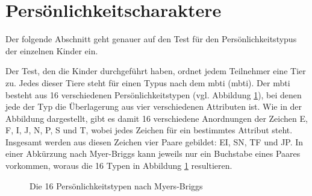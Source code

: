 \section{Persönlichkeitscharaktere}

Der folgende Abschnitt geht genauer auf den Test für den Persönlichkeitstypus der einzelnen Kinder ein.

Der Test, den die Kinder durchgeführt haben, ordnet jedem Teilnehmer eine Tier zu. Jedes dieser Tiere steht für einen Typus nach dem \acrlong{mbti} (\acrshort{mbti}). Der \acrshort{mbti} besteht aus 16 verschiedenen Persönlichkeitstypen (vgl. Abbildung \ref{img:mbti}), bei denen jede der Typ die Überlagerung aus vier verschiedenen Attributen ist. Wie in der Abbildung dargestellt, gibt es damit 16 verschiedene Anordnungen der Zeichen E, F, I, J, N, P, S und T, wobei jedes Zeichen für ein bestimmtes Attribut steht. Insgesamt werden aus diesen Zeichen vier Paare gebildet: EI, SN, TF und JP. In einer Abkürzung nach Myer-Briggs kann jeweils nur ein Buchstabe eines Paares vorkommen, woraus die 16 Typen in Abbildung \ref{img:mbti} resultieren.
\begin{figure}[htbp!]
	\centering
	\caption[Myers-Briggs-Typenindikator]{Die 16 Persönlichkeitstypen nach Myers-Briggs}
	\label{img:mbti}
\end{figure}

